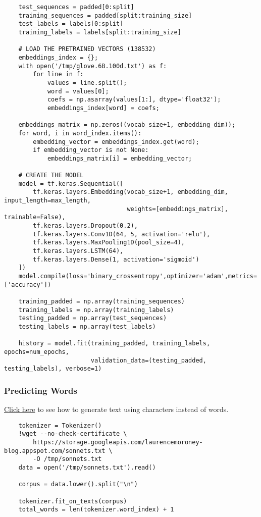 \documentclass[11pt, a4paper]{article}
\begin{document}
\begin{spacing}{1.1}
\begin{lstlisting}
	test_sequences = padded[0:split]
	training_sequences = padded[split:training_size]
	test_labels = labels[0:split]
	training_labels = labels[split:training_size]
	
	# LOAD THE PRETRAINED VECTORS (138532)
	embeddings_index = {};
	with open('/tmp/glove.6B.100d.txt') as f:
		for line in f:
			values = line.split();
			word = values[0];
			coefs = np.asarray(values[1:], dtype='float32');
			embeddings_index[word] = coefs;
	
	embeddings_matrix = np.zeros((vocab_size+1, embedding_dim));
	for word, i in word_index.items():
		embedding_vector = embeddings_index.get(word);
		if embedding_vector is not None:
			embeddings_matrix[i] = embedding_vector;
			
	# CREATE THE MODEL		
	model = tf.keras.Sequential([
		tf.keras.layers.Embedding(vocab_size+1, embedding_dim, input_length=max_length, 
		                          weights=[embeddings_matrix], trainable=False),
		tf.keras.layers.Dropout(0.2),
		tf.keras.layers.Conv1D(64, 5, activation='relu'),
		tf.keras.layers.MaxPooling1D(pool_size=4),
		tf.keras.layers.LSTM(64),
		tf.keras.layers.Dense(1, activation='sigmoid')
	])
	model.compile(loss='binary_crossentropy',optimizer='adam',metrics=['accuracy'])
	
	training_padded = np.array(training_sequences)
	training_labels = np.array(training_labels)
	testing_padded = np.array(test_sequences)
	testing_labels = np.array(test_labels)
	
	history = model.fit(training_padded, training_labels, epochs=num_epochs, 
	                    validation_data=(testing_padded, testing_labels), verbose=1) \end{lstlisting}\newpage

	\subsubsection{Predicting Words}
	\href{https://www.tensorflow.org/tutorials/text/text_generation}{Click here} to see how to generate text using characters instead of words.
	\begin{lstlisting}
	tokenizer = Tokenizer()
	!wget --no-check-certificate \
		https://storage.googleapis.com/laurencemoroney-blog.appspot.com/sonnets.txt \
		-O /tmp/sonnets.txt
	data = open('/tmp/sonnets.txt').read()
	
	corpus = data.lower().split("\n")
	
	tokenizer.fit_on_texts(corpus)
	total_words = len(tokenizer.word_index) + 1
	

\end{lstlisting}
\end{spacing}
\end{document}
